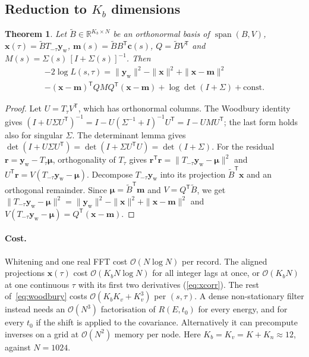 \documentclass[aps,prapplied,reprint,superscriptaddress,longbibliography,nofootinbib]{revtex4-2}
\newtheorem{theorem}{Theorem}
\theoremstyle{remark}
\newcommand{\T}{\mathsf{T}}
\newcommand{\R}{\mathbb{R}}
\newcommand{\vect}[1]{\bm{#1}}
\newcommand{\Sh}[1]{T_{#1}}
\newcommand{\yw}{\vect{y}_{\mathrm w}}
\begin{document}
\subsection{Reduction to $K_b$ dimensions}
\begin{theorem}\label{thm:woodbury}
Let $\tilde B\in\R^{K_b\times N}$ be an orthonormal basis of
$\operatorname{span}(B,V)$, $\vect x(\tau)=\tilde B\Sh{-\tau}\yw$,
$\vect m(s)=\tilde BB^\T\vect c(s)$, $Q=\tilde BV^\T$ and
$M(s)=\Sigma(s)\,[I+\Sigma(s)]^{-1}$. Then
\begin{multline}
-2\log L(s,\tau) = \|\yw\|^2-\|\vect x\|^2+\|\vect x-\vect m\|^2\\
-(\vect x-\vect m)^\T QMQ^\T(\vect x-\vect m)+\log\det\!\left(I+\Sigma\right)
+\text{const}.
\label{eq:woodbury}
\end{multline}
\end{theorem}
\begin{proof}
Let $U=\Sh{\tau}V^\T$, which has orthonormal columns. The Woodbury
identity~\cite{Woodbury1950,Hager1989} gives
$(I+U\Sigma U^\T)^{-1}=I-U(\Sigma^{-1}+I)^{-1}U^\T=I-UMU^\T$; the last form holds
also for singular $\Sigma$. The determinant lemma gives
$\det(I+U\Sigma U^\T)=\det(I+\Sigma U^\T U)=\det(I+\Sigma)$. For the residual
$\vect r=\yw-\Sh\tau\vect\mu$, orthogonality of $\Sh{\tau}$ gives
$\vect r^\T\vect r=\|\Sh{-\tau}\yw-\vect\mu\|^2$ and
$U^\T\vect r=V(\Sh{-\tau}\yw-\vect\mu)$. Decompose $\Sh{-\tau}\yw$ into its
projection $\tilde B^\T\vect x$ and an orthogonal remainder. Since
$\vect\mu=\tilde B^\T\vect m$ and $V=Q^\T\tilde B$, we get
$\|\Sh{-\tau}\yw-\vect\mu\|^2=\|\yw\|^2-\|\vect x\|^2+\|\vect x-\vect m\|^2$ and
$V(\Sh{-\tau}\yw-\vect\mu)=Q^\T(\vect x-\vect m)$.
\end{proof}

\paragraph{Cost.} Whitening and one real FFT cost $\mathcal O(N\log N)$ per record.
The aligned projections $\vect x(\tau)$ cost $\mathcal O(K_b N\log N)$ for all
integer lags at once, or $\mathcal O(K_bN)$ at one continuous $\tau$ with its first
two derivatives (\cref{eq:xcorr}). The rest of~\eqref{eq:woodbury} costs
$\mathcal O(K_bK_v+K_v^3)$ per $(s,\tau)$. A dense non-stationary filter instead
needs an $\mathcal O(N^3)$ factorisation of $R(E,t_0)$ for every energy, and for
every $t_0$ if the shift is applied to the covariance. Alternatively it can
precompute inverses on a grid at $\mathcal O(N^2)$ memory per node. Here $K_b=K_v=K+K_n\approx 12$,
against $N=1024$.
\end{document}
